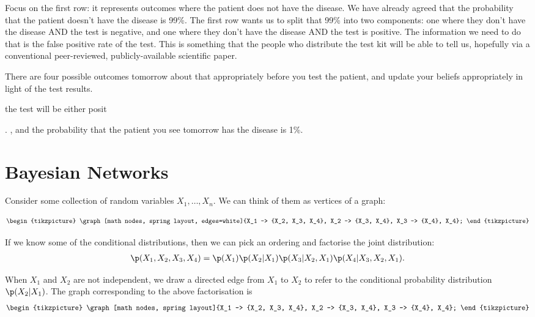 Focus on the first row: it represents outcomes where the patient does not have the disease. We have already
agreed that the probability that the patient doesn't have the disease is 99\%. The first row wants us to split
that 99\% into two components: one where they don't have the disease AND the test is negative, and one where
they don't have the disease AND the test is positive. The information we need to do that is the false positive
rate of the test. This is something that the people who distribute the test kit will be able to tell us,
hopefully via a conventional peer-reviewed, publicly-available scientific paper.






 There are four possible outcomes tomorrow
 about that appropriately before you test the patient, and update your
beliefs appropriately in light of the test results.

 the test will be either posit

. , and the probability that the patient you see tomorrow has the disease is 1\%.





\section{Bayesian Networks}


Consider some collection of random variables $X_1, \ldots, X_n$. We can think of them as vertices of a graph:

\begin{align*}
\begin{tikzpicture}
  \graph[math nodes, spring layout, edges=white]{X_1 -> {X_2, X_3, X_4}, X_2 -> {X_3, X_4}, X_3 -> {X_4}, X_4};
\end{tikzpicture}
\end{align*}


If we know some of the conditional distributions, then we can pick an ordering and factorise the joint
distribution:
\begin{align*}
  \p(X_1, X_2, X_3, X_4) = \p(X_1) \p(X_2|X_1) \p(X_3|X_2, X_1) \p(X_4|X_3, X_2, X_1).
\end{align*}

When $X_1$ and $X_2$ are not independent, we draw a directed edge from $X_1$ to $X_2$ to refer to the conditional probability distribution $\p(X_2|X_1)$. The graph corresponding to the above factorisation is
\begin{align*}
\begin{tikzpicture}
  \graph[math nodes, spring layout]{X_1 -> {X_2, X_3, X_4}, X_2 -> {X_3, X_4}, X_3 -> {X_4}, X_4};
\end{tikzpicture}
\end{align*}

